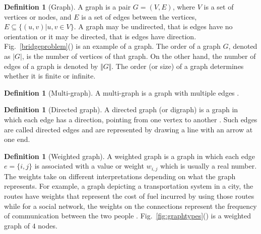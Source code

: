\documentclass[10pt,a4paper]{article}
\theoremstyle{plain}
\theoremstyle{definition}
\newtheorem{defn}[subsection]{Definition}
\begin{document}
\begin{defn}[Graph]
	A graph is a pair $G = (V,E)$, where $V$ is a set of vertices or nodes, and $E$ is a set of edges between the vertices, $E \subseteq \{(u, v )|u, v \in V \}$. A graph may be undirected, that is edges have no orientation or it may be directed, that is edges have direction. Fig.~\ref{bridgeproblem}() is an example of a graph.
	The order of a graph $G$, denoted as $|G|$, is the number of vertices of that graph. On the other hand, the number of edges of a graph is denoted by $\Vert G \Vert$. The order (or size) of a graph determines whether it is finite or infinite. 
\end{defn}

\begin{defn}[Multi-graph]
	A multi-graph is a graph with multiple edges \citep{newman2010networks}.
\end{defn}


\begin{defn}[Directed graph]
	A directed graph (or digraph) is a graph in which each edge has a direction, pointing from one vertex to another \citep{newman2010networks}. Such edges are called directed edges and are represented by drawing a line with an arrow at one end. 
\end{defn}


\begin{defn}[Weighted graph]
	A weighted graph is a graph in which each edge $e=\{i,j\}$ is associated with a value or weight $w_{i,j}$ which is usually a real number. The weights take on different interpretations depending on what the graph represents. For example, a graph depicting a transportation system in a city, the routes have weights that represent the cost of fuel incurred by using those routes while for a social network, the weights  on the connections represent the frequency of communication between the two people \citep{newman2010networks}. Fig.~\ref{fig:graphtypes}() is a weighted graph of $4$ nodes.
\end{defn}
\end{document}
